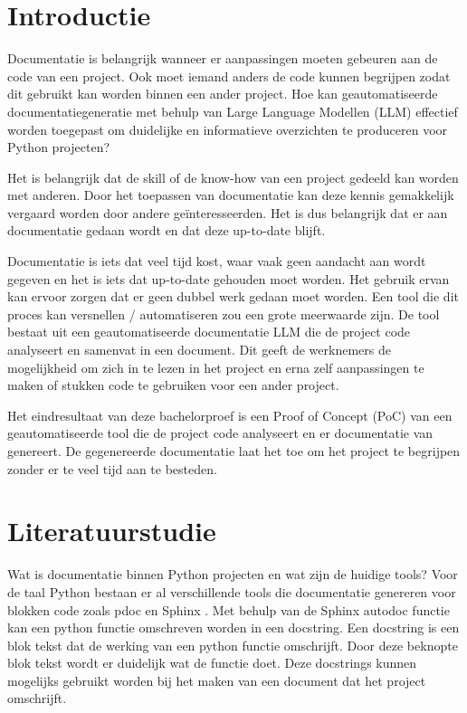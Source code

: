 
\section{Introductie}%
\label{sec:introductie}

Documentatie is belangrijk wanneer er aanpassingen moeten gebeuren aan de code van een project. 
Ook moet iemand anders de code kunnen begrijpen zodat dit gebruikt kan worden binnen een ander project.
Hoe kan geautomatiseerde documentatiegeneratie met behulp van Large Language Modellen (LLM) effectief worden toegepast om duidelijke en informatieve overzichten te produceren voor Python projecten?

Het is belangrijk dat de skill of de know-how van een project gedeeld kan worden met anderen. 
Door het toepassen van documentatie kan deze kennis gemakkelijk vergaard worden door andere geïnteresseerden.
Het is dus belangrijk dat er aan documentatie gedaan wordt en dat deze up-to-date blijft. 

Documentatie is iets dat veel tijd kost, waar vaak geen aandacht aan wordt gegeven en het is iets dat up-to-date gehouden moet worden.
Het gebruik ervan kan ervoor zorgen dat er geen dubbel werk gedaan moet worden. Een tool die dit proces kan versnellen / automatiseren zou een grote meerwaarde zijn.
De tool bestaat uit een geautomatiseerde documentatie LLM die de project code analyseert en samenvat in een document. 
Dit geeft de werknemers de mogelijkheid om zich in te lezen in het project en erna zelf aanpassingen te maken of stukken code te gebruiken voor een ander project.

Het eindresultaat van deze bachelorproef is een Proof of Concept (PoC) van een geautomatiseerde tool die de project code analyseert en er documentatie van genereert.
De gegenereerde documentatie laat het toe om het project te begrijpen zonder er te veel tijd aan te besteden.


\section{Literatuurstudie}%
\label{sec:Literatuurstudie}

Wat is documentatie binnen Python projecten en wat zijn de huidige tools?
Voor de taal Python bestaan er al verschillende tools die documentatie genereren voor blokken code zoals pdoc \autocite{GallantHils2023} en Sphinx \autocite{Sphinx2023}. 
Met behulp van de Sphinx autodoc functie \autocite{Sphinx2023} kan een python functie omschreven worden in een docstring.
Een docstring is een blok tekst dat de werking van een python functie omschrijft. Door deze beknopte blok tekst wordt er duidelijk wat de functie doet.
Deze docstrings kunnen mogelijks gebruikt worden bij het maken van een document dat het project omschrijft.

